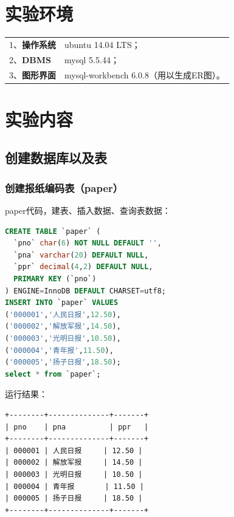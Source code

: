 \documentclass[hyperref,UTF8,c5size]{ctexart}
\begin{document}


\pagestyle{plain}
\section{实验环境}
        \begin{tabular}{@{}l@{：}l}
        1、{\bfseries 操作系统} & ubuntu 14.04 LTS； \\
        2、{\bfseries DBMS}  & mysql 5.5.44； \\
        3、{\bfseries 图形界面} & mysql-workbench 6.0.8（用以生成ER图）。 \\
        \end{tabular}

\section{实验内容}
        \subsection{创建数据库以及表}
            \subsubsection{创建报纸编码表（paper）}
                paper代码，建表、插入数据、查询表数据：
		            \begin{lstlisting}[language=SQL]
CREATE TABLE `paper` (
  `pno` char(6) NOT NULL DEFAULT '',
  `pna` varchar(20) DEFAULT NULL,
  `ppr` decimal(4,2) DEFAULT NULL,
  PRIMARY KEY (`pno`)
) ENGINE=InnoDB DEFAULT CHARSET=utf8;
INSERT INTO `paper` VALUES 
('000001','人民日报',12.50),
('000002','解放军报',14.50),
('000003','光明日报',10.50),
('000004','青年报',11.50),
('000005','扬子日报',18.50);
select * from `paper`;
                    \end{lstlisting}

                    运行结果：
		            \begin{lstlisting}
+--------+--------------+-------+
| pno    | pna          | ppr   |
+--------+--------------+-------+
| 000001 | 人民日报     | 12.50 |
| 000002 | 解放军报     | 14.50 |
| 000003 | 光明日报     | 10.50 |
| 000004 | 青年报       | 11.50 |
| 000005 | 扬子日报     | 18.50 |
+--------+--------------+-------+
                    \end{lstlisting}
\end{document}
